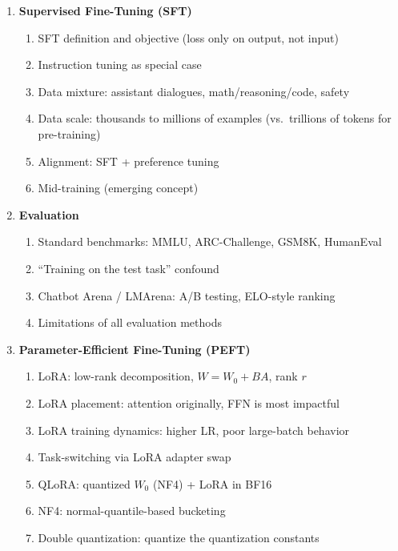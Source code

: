 \documentclass[11pt, a4paper]{article}
\begin{document}
\begin{enumerate}[label=\textbf{\arabic*.}, leftmargin=2em]
  \item \textbf{Supervised Fine-Tuning (SFT)}
    \begin{enumerate}[label=\arabic{enumi}.\arabic*]
      \item SFT definition and objective (loss only on output, not input)
      \item Instruction tuning as special case
      \item Data mixture: assistant dialogues, math/reasoning/code, safety
      \item Data scale: thousands to millions of examples (vs.\ trillions of tokens for pre-training)
      \item Alignment: SFT + preference tuning
      \item Mid-training (emerging concept)
    \end{enumerate}

  \item \textbf{Evaluation}
    \begin{enumerate}[label=\arabic{enumi}.\arabic*]
      \item Standard benchmarks: MMLU, ARC-Challenge, GSM8K, HumanEval
      \item ``Training on the test task'' confound
      \item Chatbot Arena / LMArena: A/B testing, ELO-style ranking
      \item Limitations of all evaluation methods
    \end{enumerate}

  \item \textbf{Parameter-Efficient Fine-Tuning (PEFT)}
    \begin{enumerate}[label=\arabic{enumi}.\arabic*]
      \item LoRA: low-rank decomposition, $W = W_0 + BA$, rank $r$
      \item LoRA placement: attention originally, FFN is most impactful
      \item LoRA training dynamics: higher LR, poor large-batch behavior
      \item Task-switching via LoRA adapter swap
      \item QLoRA: quantized $W_0$ (NF4) + LoRA in BF16
      \item NF4: normal-quantile-based bucketing
      \item Double quantization: quantize the quantization constants
    \end{enumerate}
\end{enumerate}
\end{document}
